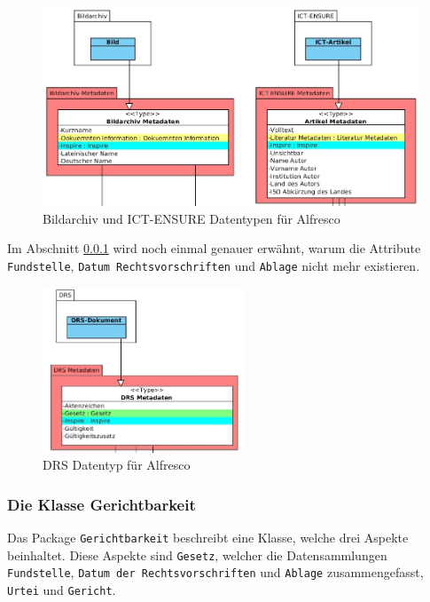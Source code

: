 \begin{figure}[!ht]
\centering
\includegraphics[width=12cm]{Bilder/AlfrescoModell/Bildarchiv-und-ICT-Datentypen.jpg}
\caption{Bildarchiv und ICT-ENSURE Datentypen f\"ur Alfresco}
\label{Bildarchiv und ICT-ENSURE Datentypen f\"ur Alfresco}
\centering
\end{figure}

Im Abschnitt \ref{Die Klasse Gerichtbarkeit} wird noch einmal genauer erw\"ahnt, warum die Attribute \texttt{Fundstelle}, \texttt{Datum Rechtsvorschriften} und \texttt{Ablage} nicht mehr existieren.

\begin{figure}[!ht]
\centering
\includegraphics[width=6cm]{Bilder/AlfrescoModell/DRS-Datentypen.jpg}
\caption{DRS Datentyp f\"ur Alfresco}
\label{DRS Datentyp f\"ur Alfresco}
\centering
\end{figure}

\FloatBarrier
\subsubsection{Die Klasse Gerichtbarkeit}\label{Die Klasse Gerichtbarkeit}
Das Package \texttt{Gerichtbarkeit} beschreibt eine Klasse, welche drei Aspekte beinhaltet. Diese Aspekte sind \texttt{Gesetz}, welcher die Datensammlungen \texttt{Fundstelle}, \texttt{Datum der Rechtsvorschriften} und \texttt{Ablage} zusammengefasst, \texttt{Urtei} und \texttt{Gericht}. 

